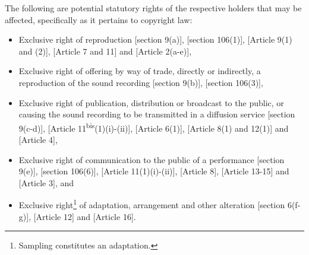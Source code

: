 \documentclass[11pt]{article}
\begin{document}
The following are potential statutory rights of the respective holders that may
be affected, specifically as it pertains to copyright law:

\begin{itemize}
\item Exclusive right of reproduction [section 9(a)]\cite{rsa78_copyrightact},
[section 106(1)]\cite{usa76_title17_us_copyright_act}, [Article 9(1) and
(2)]\cite{wipo86_berne}, [Article 7 and 11]\cite{wipo96_wppt} and [Article
2(a-e)]\cite{eurlex01_harmonisation},

\item Exclusive right of offering by way of trade, directly or indirectly, a
reproduction of the sound recording [section 9(b)]\cite{rsa78_copyrightact}, [section 106(3)]\cite{usa76_title17_us_copyright_act},

\item Exclusive right of publication, distribution or broadcast to the public, or
causing the sound recording to be transmitted in a diffusion service [section
9(c-d)]\cite{rsa78_copyrightact}, [Article
11\textsuperscript{bis}(1)(i)-(ii)]\cite{wipo86_berne}, [Article
6(1)]\cite{wipo96_copyright_treaty}, [Article 8(1) and 12(1)]\cite{wipo96_wppt}
and [Article 4]\cite{eurlex01_harmonisation},

\item Exclusive right of communication to the public of a performance [section
9(e)]\cite{rsa78_copyrightact}, [section
106(6)]\cite{usa76_title17_us_copyright_act}, [Article
11(1)(i)-(ii)]\cite{wipo86_berne}, [Article 8]\cite{wipo96_copyright_treaty},
[Article 13-15]\cite{wipo96_wppt} and [Article 3]\cite{eurlex01_harmonisation},
and

\item Exclusive right\footnote{Sampling constitutes an adaptation.} of adaptation,
arrangement and other alteration [section 6(f-g)]\cite{rsa78_copyrightact},
[Article 12]\cite{wipo86_berne} and [Article 16]\cite{wipo96_wppt}.
\end{itemize}

\printbibliography
\end{document}
